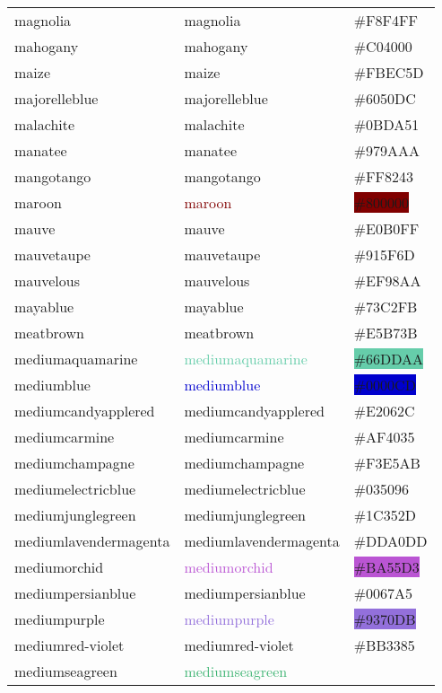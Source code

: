 \documentclass[
]{article}
\begin{document}
\begin{longtable}[]{@{}lll@{}}
magnolia & \textcolor{magnolia}{magnolia} &
\colorbox{magnolia}{\#F8F4FF}\tabularnewline
mahogany & \textcolor{mahogany}{mahogany} &
\colorbox{mahogany}{\#C04000}\tabularnewline
maize & \textcolor{maize}{maize} &
\colorbox{corn}{\#FBEC5D}\tabularnewline
majorelleblue & \textcolor{majorelleblue}{majorelleblue} &
\colorbox{majorelleblue}{\#6050DC}\tabularnewline
malachite & \textcolor{malachite}{malachite} &
\colorbox{malachite}{\#0BDA51}\tabularnewline
manatee & \textcolor{manatee}{manatee} &
\colorbox{manatee}{\#979AAA}\tabularnewline
mangotango & \textcolor{mangotango}{mangotango} &
\colorbox{mangotango}{\#FF8243}\tabularnewline
maroon & \textcolor{maroon}{maroon} &
\colorbox{maroon}{\#800000}\tabularnewline
mauve & \textcolor{mauve}{mauve} &
\colorbox{mauve}{\#E0B0FF}\tabularnewline
mauvetaupe & \textcolor{mauvetaupe}{mauvetaupe} &
\colorbox{mauvetaupe}{\#915F6D}\tabularnewline
mauvelous & \textcolor{mauvelous}{mauvelous} &
\colorbox{mauvelous}{\#EF98AA}\tabularnewline
mayablue & \textcolor{mayablue}{mayablue} &
\colorbox{mayablue}{\#73C2FB}\tabularnewline
meatbrown & \textcolor{meatbrown}{meatbrown} &
\colorbox{meatbrown}{\#E5B73B}\tabularnewline
mediumaquamarine & \textcolor{mediumaquamarine}{mediumaquamarine} &
\colorbox{mediumaquamarine}{\#66DDAA}\tabularnewline
mediumblue & \textcolor{mediumblue}{mediumblue} &
\colorbox{mediumblue}{\#0000CD}\tabularnewline
mediumcandyapplered &
\textcolor{mediumcandyapplered}{mediumcandyapplered} &
\colorbox{mediumcandyapplered}{\#E2062C}\tabularnewline
mediumcarmine & \textcolor{mediumcarmine}{mediumcarmine} &
\colorbox{mediumcarmine}{\#AF4035}\tabularnewline
mediumchampagne & \textcolor{mediumchampagne}{mediumchampagne} &
\colorbox{mediumchampagne}{\#F3E5AB}\tabularnewline
mediumelectricblue & \textcolor{mediumelectricblue}{mediumelectricblue}
& \colorbox{mediumelectricblue}{\#035096}\tabularnewline
mediumjunglegreen & \textcolor{mediumjunglegreen}{mediumjunglegreen} &
\colorbox{mediumjunglegreen}{\#1C352D}\tabularnewline
mediumlavendermagenta &
\textcolor{mediumlavendermagenta}{mediumlavendermagenta} &
\colorbox{mediumlavendermagenta}{\#DDA0DD}\tabularnewline
mediumorchid & \textcolor{mediumorchid}{mediumorchid} &
\colorbox{mediumorchid}{\#BA55D3}\tabularnewline
mediumpersianblue & \textcolor{mediumpersianblue}{mediumpersianblue} &
\colorbox{mediumpersianblue}{\#0067A5}\tabularnewline
mediumpurple & \textcolor{mediumpurple}{mediumpurple} &
\colorbox{mediumpurple}{\#9370DB}\tabularnewline
mediumred-violet & \textcolor{mediumred-violet}{mediumred-violet} &
\colorbox{mediumred-violet}{\#BB3385}\tabularnewline
mediumseagreen & \textcolor{mediumseagreen}{mediumseagreen} &

\end{longtable}
\end{document}
